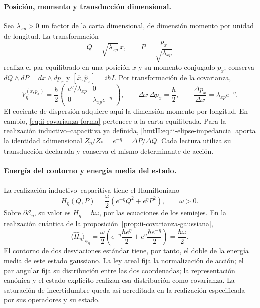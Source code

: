 \paragraph{Posición, momento y transducción dimensional.}
Sea \(\lambda_{xp}>0\) un factor de la carta dimensional, de dimensión
momento por unidad de longitud. La transformación
\[
 Q=\sqrt{\lambda_{xp}}\,x,\qquad
 P=\frac{p_x}{\sqrt{\lambda_{xp}}}
\]
realiza el par equilibrado en una posición \(x\) y su momento conjugado
\(p_x\); conserva \(dQ\wedge dP=dx\wedge dp_x\) y
\([\widehat x,\widehat p_x]=i\hbar I\). Por transformación de la
covarianza,
\begin{equation}
 V_\eta^{(x,p_x)}=\frac{\hbar}{2}
 \begin{pmatrix}e^\eta/\lambda_{xp}&0\\
                 0&\lambda_{xp}e^{-\eta}\end{pmatrix},\qquad
 \Delta x\,\Delta p_x=\frac{\hbar}{2},\qquad
 \frac{\Delta p_x}{\Delta x}=\lambda_{xp}e^{-\eta}.
 \label{eq:ii-covarianza-dimensiones}
\end{equation}
El cociente de dispersión adquiere aquí la dimensión momento por longitud.
En cambio, \eqref{eq:ii-covarianza-forma} pertenece a la carta equilibrada.
Para la realización inductivo--capacitiva ya definida,
\eqref{hmtII:eq:ii-elipse-impedancia} aporta la identidad adimensional
\(Z_\eta/Z_*=e^{-\eta}=\Delta P/\Delta Q\).
Cada lectura utiliza su transducción declarada y conserva el mismo
determinante de acción.

\paragraph{Energía del contorno y energía media del estado.}
La realización inductivo--capacitiva tiene el Hamiltoniano
\[
 H_\eta(Q,P)=\frac{\omega}{2}
 \left(e^{-\eta}Q^2+e^\eta P^2\right),\qquad \omega>0.
\]
Sobre \(\partial\mathcal E_\eta\), su valor es
\(H_\eta=\hbar\omega\), por las ecuaciones de los semiejes. En la
realización cuántica de la proposición~\ref{prop:ii-covarianza-gaussiana},
\begin{equation}
 \langle\widehat H_\eta\rangle_{\psi_\eta}
 =\frac{\omega}{2}
 \left(e^{-\eta}\frac{\hbar e^\eta}{2}
       +e^\eta\frac{\hbar e^{-\eta}}{2}\right)
 =\frac{\hbar\omega}{2}.
 \label{eq:ii-energia-contorno-covarianza}
\end{equation}
El contorno de dos desviaciones estándar tiene, por tanto, el doble de la
energía media de este estado gaussiano. La ley areal fija la normalización
de acción; el par angular fija su distribución entre las dos coordenadas;
la representación canónica y el estado explícito realizan esa distribución
como covarianza. La saturación de incertidumbre queda así acreditada en
la realización especificada por sus operadores y su estado.
